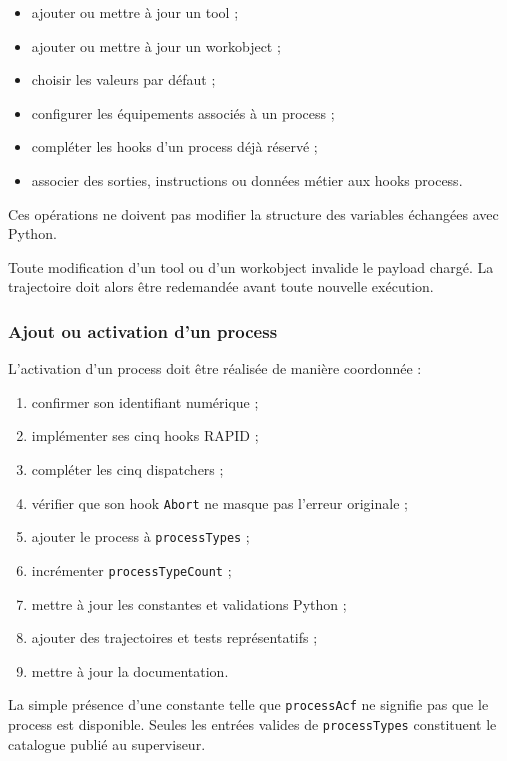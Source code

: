 \documentclass{rapportENSAM}
\begin{document}
\begin{itemize}
    \item ajouter ou mettre à jour un tool ;
    \item ajouter ou mettre à jour un workobject ;
    \item choisir les valeurs par défaut ;
    \item configurer les équipements associés à un process ;
    \item compléter les hooks d'un process déjà réservé ;
    \item associer des sorties, instructions ou données métier aux hooks
    process.
\end{itemize}

Ces opérations ne doivent pas modifier la structure des variables échangées
avec Python.

Toute modification d'un tool ou d'un workobject invalide le payload chargé.
La trajectoire doit alors être redemandée avant toute nouvelle exécution.


\subsubsection{Ajout ou activation d'un process}
\label{subsubsec:rapid-process-changes}

L'activation d'un process doit être réalisée de manière coordonnée :

\begin{enumerate}
    \item confirmer son identifiant numérique ;
    \item implémenter ses cinq hooks RAPID ;
    \item compléter les cinq dispatchers ;
    \item vérifier que son hook \texttt{Abort} ne masque pas l'erreur
    originale ;
    \item ajouter le process à \texttt{processTypes} ;
    \item incrémenter \texttt{processTypeCount} ;
    \item mettre à jour les constantes et validations Python ;
    \item ajouter des trajectoires et tests représentatifs ;
    \item mettre à jour la documentation.
\end{enumerate}

La simple présence d'une constante telle que \texttt{processAcf} ne signifie
pas que le process est disponible. Seules les entrées valides de
\texttt{processTypes} constituent le catalogue publié au superviseur.
\end{document}
